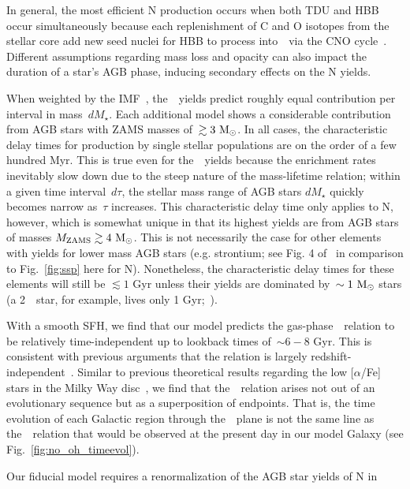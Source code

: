 \documentclass[ms.tex]{subfiles}
\begin{document}
In general, the most efficient N production occurs when both TDU and HBB
occur simultaneously because each replenishment of C and O isotopes from the
stellar core add new seed nuclei for HBB to process into~\Nfourteen~via the
CNO cycle~\citep{Ventura2013}.
Different assumptions regarding mass loss and opacity can also impact the
duration of a star's AGB phase, inducing secondary effects on the N yields.
\par
When weighted by the IMF~\citep{Kroupa2001}, the~\cristallo~yields predict
roughly equal contribution per interval in mass~$dM_\star$.
Each additional model shows a considerable contribution from AGB stars with
ZAMS masses of~$\gtrsim 3~\text{M}_\odot$.
In all cases, the characteristic delay times for production by single stellar
populations are on the order of a few hundred Myr.
This is true even for the~\cristallo~yields because the enrichment rates
inevitably slow down due to the steep nature of the mass-lifetime relation;
within a given time interval~$d\tau$, the stellar mass range of AGB stars
$dM_\star$ quickly becomes narrow as~$\tau$ increases.
This characteristic delay time only applies to N, however, which is somewhat
unique in that its highest yields are from AGB stars of masses
$M_\text{ZAMS} \gtrsim 4~\text{M}_\odot$.
This is not necessarily the case for other elements with yields for lower mass
AGB stars (e.g. strontium; see Fig. 4 of~\citealp{Johnson2020} in comparison to
Fig.~\ref{fig:ssp} here for N).
Nonetheless, the characteristic delay times for these elements will still be
$\lesssim 1$ Gyr unless their yields are dominated by~$\sim1~\text{M}_\odot$ stars (a
2~\msun~star, for example, lives only 1 Gyr;~\citealp{Larson1974, Maeder1998,
Padovani1993}).
\par
With a smooth SFH, we find that our model predicts the gas-phase~\ohno~relation
to be relatively time-independent up to lookback times of~$\sim6 - 8$ Gyr.
This is consistent with previous arguments that the relation is largely
redshift-independent~\citep{Vincenzo2018, HaydenPawson2021}.
Similar to previous theoretical results regarding the low [$\alpha$/Fe] stars
in the Milky Way disc~\citep[e.g.][]{Schoenrich2009, Sharma2021, Johnson2021},
we find that the~\ohno~relation arises not out of an evolutionary sequence but
as a superposition of endpoints.
That is, the time evolution of each Galactic region through the~\ohno~plane
is not the same line as the~\ohno~relation that would be observed at the
present day in our model Galaxy (see Fig.~\ref{fig:no_oh_timeevol}).
\par
Our fiducial model requires a renormalization of the AGB star yields of N in
\end{document}
